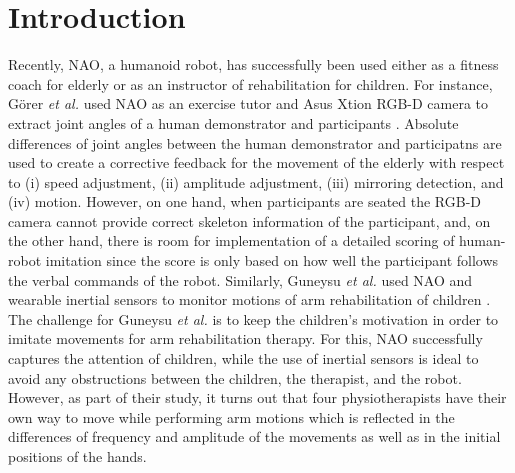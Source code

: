 \documentclass{sig-alternate-05-2015}
\begin{document}


%
%

%
%
\printccsdesc



\section{Introduction}
Recently, NAO, a humanoid robot, has successfully been used either as a fitness coach for elderly 
or as an instructor of rehabilitation for children.
For instance, G{\"{o}}rer \textit{et al.} used NAO as an exercise tutor
and Asus Xtion RGB-D camera to extract joint angles of a human demonstrator and participants \cite{Gorer2016}.
Absolute differences of joint angles between the human demonstrator and participatns
are used to create a corrective feedback for the movement of the elderly 
with respect to (i) speed adjustment, (ii) amplitude adjustment, (iii) mirroring detection, and (iv) motion.
However, on one hand, when participants are seated the RGB-D camera cannot provide correct skeleton information
of the participant,
and, on the other hand, there is room for implementation of a detailed scoring of human-robot imitation
since the score is only based on how well the participant follows the verbal commands of the robot.
Similarly, Guneysu \textit{et al.} used NAO and wearable inertial sensors
to monitor motions of arm rehabilitation of children \cite{Guneysu2015}.
The challenge for Guneysu \textit{et al.} is to keep the children's motivation in order to imitate 
movements for arm rehabilitation therapy. 
For this, NAO successfully captures the attention of children,
while the use of inertial sensors is ideal to avoid any  
obstructions between the children, the therapist, and  the robot.
However, as part of their study, it turns out that four physiotherapists have their own way to move
while performing
arm motions
which is reflected in the differences of frequency and amplitude of the movements
as well as in the initial positions of the hands.
\end{document}
